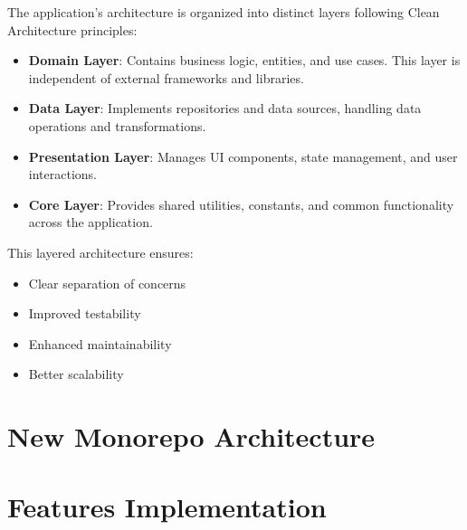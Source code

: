 The application's architecture is organized into distinct layers following Clean Architecture principles:

\begin{itemize}
    \item \textbf{Domain Layer}: Contains business logic, entities, and use cases. This layer is independent of external frameworks and libraries.
    
    \item \textbf{Data Layer}: Implements repositories and data sources, handling data operations and transformations.
    
    \item \textbf{Presentation Layer}: Manages UI components, state management, and user interactions.
    
    \item \textbf{Core Layer}: Provides shared utilities, constants, and common functionality across the application.
\end{itemize}

This layered architecture ensures:
\begin{itemize}
    \item Clear separation of concerns
    \item Improved testability
    \item Enhanced maintainability
    \item Better scalability
\end{itemize}

\section{New Monorepo Architecture}
\label{sec:new-monorepo-architecture}

\section{Features Implementation}
\label{sec:features-implementation}